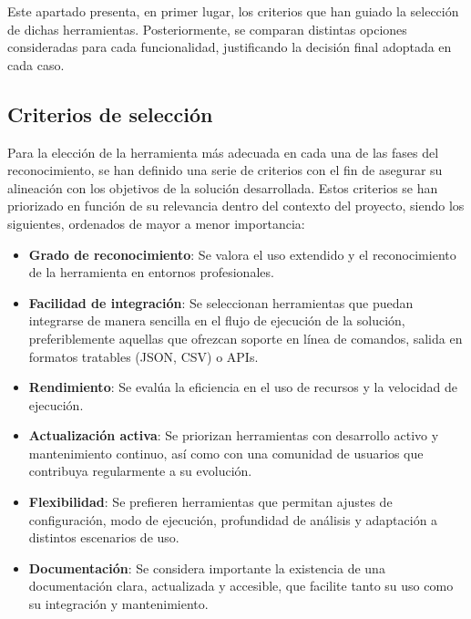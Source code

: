\begin{parskipenv}
Este apartado presenta, en primer lugar, los criterios que han guiado la selección de dichas herramientas. Posteriormente, se comparan distintas opciones consideradas para cada funcionalidad, justificando la decisión final adoptada en cada caso.

\subsection{Criterios de selección}
Para la elección de la herramienta más adecuada en cada una de las fases del reconocimiento, se han definido una serie de criterios con el fin de asegurar su alineación con los objetivos de la solución desarrollada. Estos criterios se han priorizado en función de su relevancia dentro del contexto del proyecto, siendo los siguientes, ordenados de mayor a menor importancia:

\begin{itemize}    
    \item \textbf{Grado de reconocimiento}: Se valora el uso extendido y el reconocimiento de la herramienta en entornos profesionales.
    
    \item \textbf{Facilidad de integración}: Se seleccionan herramientas que puedan integrarse de manera sencilla en el flujo de ejecución de la solución, preferiblemente aquellas que ofrezcan soporte en línea de comandos, salida en formatos tratables (JSON, CSV) o APIs.
    
    \item \textbf{Rendimiento}: Se evalúa la eficiencia en el uso de recursos y la velocidad de ejecución.
    
    \item \textbf{Actualización activa}: Se priorizan herramientas con desarrollo activo y mantenimiento continuo, así como con una comunidad de usuarios que contribuya regularmente a su evolución.
    
    \item \textbf{Flexibilidad}: Se prefieren herramientas que permitan ajustes de configuración, modo de ejecución, profundidad de análisis y adaptación a distintos escenarios de uso.
    
    \item \textbf{Documentación}: Se considera importante la existencia de una documentación clara, actualizada y accesible, que facilite tanto su uso como su integración y mantenimiento.
\end{itemize}


\end{parskipenv}

